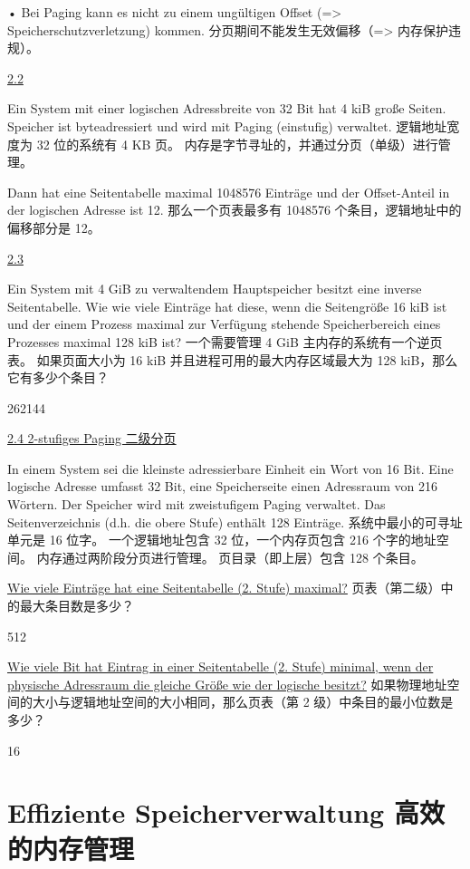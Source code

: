 \documentclass[fleqn]{article}
\begin{document}
•	Bei Paging kann es nicht zu einem ungültigen Offset (=> Speicherschutzverletzung) kommen.
分页期间不能发生无效偏移（=> 内存保护违规）。

\noindent\uline{2.2}

\noindent Ein System mit einer logischen Adressbreite von 32 Bit hat 4 kiB große Seiten. Speicher ist byteadressiert und wird mit Paging (einstufig) verwaltet.
逻辑地址宽度为 32 位的系统有 4 KB 页。 内存是字节寻址的，并通过分页（单级）进行管理。

Dann hat eine Seitentabelle maximal 1048576 Einträge und der Offset-Anteil in der logischen Adresse ist 12.
那么一个页表最多有 1048576 个条目，逻辑地址中的偏移部分是 12。

\noindent\uline{2.3}

\noindent Ein System mit 4 GiB zu verwaltendem Hauptspeicher besitzt eine inverse Seitentabelle. Wie wie viele Einträge hat diese, wenn die Seitengröße 16 kiB ist und der einem Prozess maximal zur Verfügung stehende Speicherbereich eines Prozesses maximal 128 kiB ist?
一个需要管理 4 GiB 主内存的系统有一个逆页表。 如果页面大小为 16 kiB 并且进程可用的最大内存区域最大为 128 kiB，那么它有多少个条目？

262144

\noindent\uline{2.4 2-stufiges Paging 二级分页}

\noindent In einem System sei die kleinste adressierbare Einheit ein Wort von 16 Bit. Eine logische Adresse umfasst 32 Bit, eine Speicherseite einen Adressraum von 216 Wörtern. Der Speicher wird mit zweistufigem Paging verwaltet. Das Seitenverzeichnis (d.h. die obere Stufe) enthält 128 Einträge.
系统中最小的可寻址单元是 16 位字。 一个逻辑地址包含 32 位，一个内存页包含 216 个字的地址空间。 内存通过两阶段分页进行管理。 页目录（即上层）包含 128 个条目。

\uline{Wie viele Einträge hat eine Seitentabelle (2. Stufe) maximal?} 页表（第二级）中的最大条目数是多少？

512

\uline{Wie viele Bit hat Eintrag in einer Seitentabelle (2. Stufe) minimal, wenn der physische Adressraum die gleiche Größe wie der logische besitzt?}
如果物理地址空间的大小与逻辑地址空间的大小相同，那么页表（第 2 级）中条目的最小位数是多少？

16




\section{Effiziente Speicherverwaltung 高效的内存管理}
\end{document}
